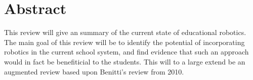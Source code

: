 \section*{Abstract}
	This review will give an summary of the current state of educational robotics. 
	The main goal of this review will be to identify the potential of incorporating robotics in the current school system, and find evidence that such an approach would in fact be benefiticial to the students. 
	This will to a large extend be an augmented review based upon Benitti's review from 2010\cite{Benitti2012978}.
	
	